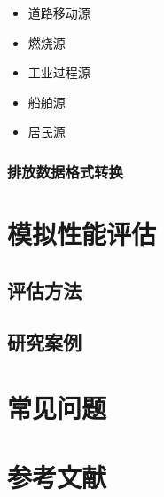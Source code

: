\documentclass{article}
\begin{document}
\begin{itemize}

\item 道路移动源

\item 燃烧源

\item 工业过程源

\item 船舶源

\item 居民源

\end{itemize}

\subsubsection{排放数据格式转换}

\section{模拟性能评估}

\subsection{评估方法}

\subsection{研究案例}

\section{常见问题}

\section{参考文献}

\end{document}
